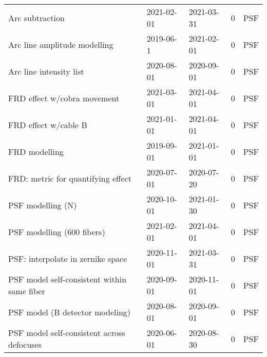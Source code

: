 \begin{tabular}{lllrl}
                             Arc subtraction &  2021-02-01 &  2021-03-31 &         0 &                    PSF \\
                Arc line amplitude modelling &   2019-06-1 &  2021-02-01 &         0 &                    PSF \\
                     Arc line intensity list &  2020-08-01 &  2020-09-01 &         0 &                    PSF \\
                 FRD effect w/cobra movement &  2021-03-01 &  2021-04-01 &         0 &                    PSF \\
                        FRD effect w/cable B &  2021-01-01 &  2021-04-01 &         0 &                    PSF \\
                               FRD modelling &  2019-09-01 &  2021-01-01 &         0 &                    PSF \\
          FRD: metric for quantifying effect &  2020-07-01 &  2020-07-20 &         0 &                    PSF \\
                           PSF modelling (N) &  2020-10-01 &  2021-01-30 &         0 &                    PSF \\
                  PSF modelling (600 fibers) &  2021-02-01 &  2021-04-01 &         0 &                    PSF \\
           PSF: interpolate in zernike space &  2020-11-01 &  2021-03-31 &         0 &                    PSF \\
 PSF model self-consistent within same fiber &  2020-09-01 &  2020-11-01 &         0 &                    PSF \\
             PSF model (B detector modeling) &  2020-08-01 &  2020-09-01 &         0 &                    PSF \\
  PSF model self-consistent across defocuses &  2020-06-01 &  2020-08-30 &         0 &                    PSF \\
\bottomrule
\end{tabular}
